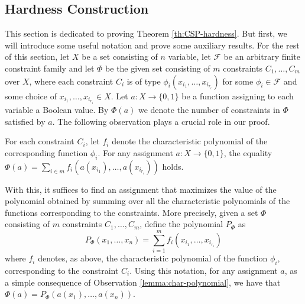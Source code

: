 \documentclass[a4paper,UKenglish,cleveref, autoref, thm-restate,numberwithinsect]{lipics-v2021}
\newcommand{\Fam}{\mathcal{F}}
\begin{document}
\subsection{Hardness Construction} This section is dedicated to proving Theorem \ref{th:CSP-hardness}.
But first, we will introduce some useful notation and prove some auxiliary results.
For the rest of this section, let $X$ be a set consisting of $n$ variable, let $\Fam$ be an arbitrary finite constraint family and let $\Phi$ be the given set consisting of $m$ constraints $C_1,\dots, C_m$ over $X$, where each constraint $C_i$ is of type $\phi_i(x_{i_1},\dots, x_{i_{r_i}})$ for some $\phi_i\in \Fam$ and some choice of $x_{i_1},\dots, x_{i_{r_i}}\in X$.
Let $a:X \to \{0,1\}$ be a function assigning to each variable a Boolean value. By $\Phi(a)$ we denote the number of constraints in $\Phi$ satisfied by $a$. 
The following observation plays a crucial role in our proof.
\begin{observation} \label{lemma:char-polynomial}
    For each constraint $C_i$, let $f_i$ denote the characteristic polynomial of the corresponding function $\phi_i$.
    For any assignment $a:X\to \{0,1\}$, the equality $\Phi(a) = \sum_{i\in m} f_i(a(x_{i_1}), \dots, a(x_{i_{r_i}}))$ holds.
\end{observation}

With this, it suffices to find an assignment that maximizes the value of the polynomial obtained by summing over all the characteristic polynomials of the functions corresponding to the constraints. 
More precisely, given a set $\Phi$ consisting of $m$ constraints $C_1,\dots, C_m$, define the polynomial $P_\Phi$ as 
\[
    P_\Phi(x_1,\dots, x_n) = \sum_{i=1}^m f_i(x_{i_1},\dots, x_{i_{r_i}})
\]
where $f_i$ denotes, as above, the characteristic polynomial of the function $\phi_i$, corresponding to the constraint $C_i$.
Using this notation, for any assignment $a$, as a simple consequence of Observation \ref{lemma:char-polynomial}, we have that $\Phi(a) = P_\Phi(a(x_1),\dots, a(x_n))$.
\end{document}

